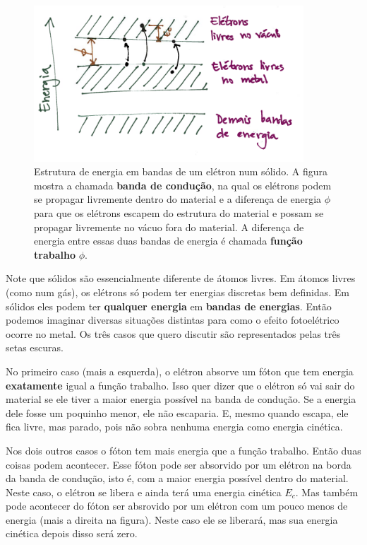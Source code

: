 \documentclass{article}
\begin{document}
\begin{figure}[ht]
\centering
\includegraphics[width=0.9\textwidth]{bandas.png}
\caption{\label{fig:bandas}Estrutura de energia em bandas de um el\'etron num s\'olido. A figura mostra a chamada \textbf{banda de condu\c c\~ao}, na qual os el\'etrons podem se propagar livremente dentro do material e a diferen\c ca de energia $\phi$ para que os el\'etrons escapem do estrutura do material e possam se propagar livremente no v\'acuo fora do material. A diferen\c ca de energia entre essas duas bandas de energia \'e chamada \textbf{fun\c c\~ao trabalho} $\phi$.}
\end{figure}
Note que s\'olidos s\~ao essencialmente diferente de \'atomos livres. Em \'atomos livres (como num g\'as), os el\'etrons s\'o podem ter energias discretas bem definidas. Em s\'olidos eles podem ter \textbf{qualquer energia} em \textbf{bandas de energias}. Ent\~ao podemos imaginar diversas situa\c c\~oes distintas para como o efeito fotoel\'etrico ocorre no metal. Os tr\^es casos que quero discutir s\~ao representados pelas tr\^es setas escuras.

No primeiro caso (mais a esquerda), o el\'etron absorve um f\'oton que tem energia \textbf{exatamente} igual a fun\c c\~ao trabalho. Isso quer dizer que o el\'etron s\'o vai sair do material se ele tiver a maior energia poss\'ivel na banda de condu\c c\~ao. Se a energia dele fosse um poquinho menor, ele n\~ao escaparia. E, mesmo quando escapa, ele fica livre, mas parado, pois n\~ao sobra nenhuma energia como energia cin\'etica.

Nos dois outros casos o f\'oton tem mais energia que a fun\c c\~ao trabalho. Ent\~ao duas coisas podem acontecer. Esse f\'oton pode ser absorvido por um el\'etron na borda da banda de condu\c c\~ao, isto \'e, com a maior energia poss\'ivel dentro do material. Neste caso, o el\'etron se libera e ainda ter\'a uma energia cin\'etica $E_c$. Mas tamb\'em pode acontecer do f\'oton ser absrovido por um el\'etron com um pouco menos de energia (mais a direita na figura). Neste caso ele se liberar\'a, mas sua energia cin\'etica depois disso ser\'a zero.
\end{document}
